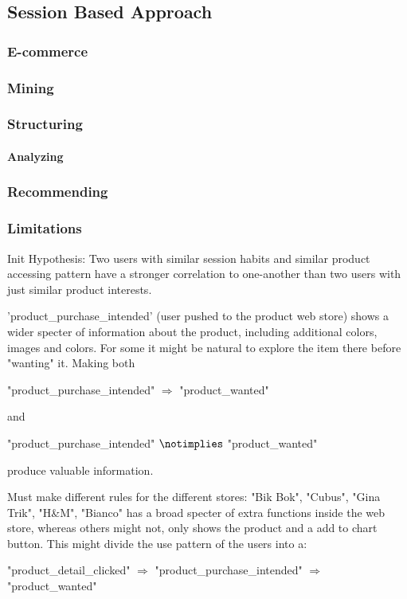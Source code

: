 \subsection{Session Based Approach}
\subsubsection{E-commerce}
\subsubsection{Mining}
\subsubsection{Structuring}
\paragraph{Analyzing}
\subsubsection{Recommending}
\subsubsection{Limitations}


Init Hypothesis:
Two users with similar session habits and similar product accessing pattern
have a stronger correlation to one-another than two users with just similar
product interests.


'product\_purchase\_intended' (user pushed to the product web store) shows a
wider specter of information about the product, including additional colors,
images and colors.  For some it might be natural to explore the item there
before "wanting" it. Making both

"product\_purchase\_intended" $\Rightarrow$ "product\_wanted"

and

"product\_purchase\_intended" $\notimplies$ "product\_wanted"

produce valuable information.

Must make different rules for the different stores:
"Bik Bok", "Cubus", "Gina Trik", "H\&M", "Bianco" has a broad specter of extra
functions inside the web store, whereas others might not, only shows the
product and a add to chart button.  This might divide the use pattern of the
users into a:

"product\_detail\_clicked" $\Rightarrow$ "product\_purchase\_intended" $\Rightarrow$ "product\_wanted"

